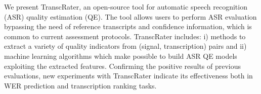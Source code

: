 We present TranscRater, an open-source tool for  automatic speech recognition (ASR) quality estimation (QE). The tool allows users to perform ASR evaluation bypassing the need of reference transcripts and confidence information, which is common to current assessment protocols. TranscRater includes: i) methods to extract a variety of quality indicators from (signal, transcription) pairs and ii) machine  learning algorithms which make possible to build ASR QE models exploiting the extracted features. Confirming the positive results of previous evaluations, new experiments with TranscRater indicate its effectiveness both in WER prediction and transcription ranking tasks.
